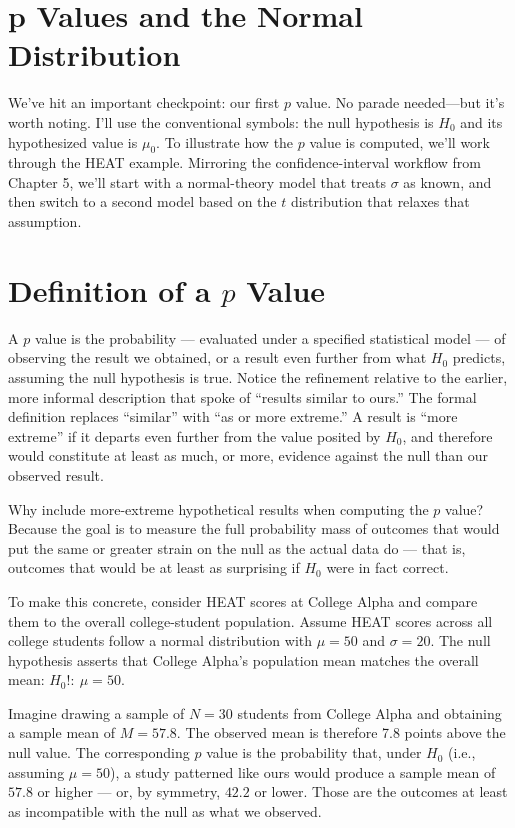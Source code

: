 \documentclass[
  letterpaper,
  DIV=11,
  numbers=noendperiod]{scrreprt}
\begin{document}
\section{p Values and the Normal
Distribution}\label{p-values-and-the-normal-distribution}

We've hit an important checkpoint: our first \(p\) value. No parade
needed---but it's worth noting. I'll use the conventional symbols: the
null hypothesis is \(H_0\) and its hypothesized value is \(\mu_0\). To
illustrate how the \(p\) value is computed, we'll work through the HEAT
example. Mirroring the confidence-interval workflow from Chapter 5,
we'll start with a normal-theory model that treats \(\sigma\) as known,
and then switch to a second model based on the \(t\) distribution that
relaxes that assumption.

\section{\texorpdfstring{Definition of a \(p\)
Value}{Definition of a p Value}}\label{definition-of-a-p-value}

A \(p\) value is the probability --- evaluated under a specified
statistical model --- of observing the result we obtained, or a result
even further from what \(H_0\) predicts, assuming the null hypothesis is
true. Notice the refinement relative to the earlier, more informal
description that spoke of ``results similar to ours.'' The formal
definition replaces ``similar'' with ``as or more extreme.'' A result is
``more extreme'' if it departs even further from the value posited by
\(H_0\), and therefore would constitute at least as much, or more,
evidence against the null than our observed result.

Why include more-extreme hypothetical results when computing the \(p\)
value? Because the goal is to measure the full probability mass of
outcomes that would put the same or greater strain on the null as the
actual data do --- that is, outcomes that would be at least as
surprising if \(H_0\) were in fact correct.

To make this concrete, consider HEAT scores at College Alpha and compare
them to the overall college-student population. Assume HEAT scores
across all college students follow a normal distribution with
\(\mu = 50\) and \(\sigma = 20\). The null hypothesis asserts that
College Alpha's population mean matches the overall mean:
\(H_0!:\ \mu = 50\).

Imagine drawing a sample of \(N = 30\) students from College Alpha and
obtaining a sample mean of \(M = 57.8\). The observed mean is therefore
7.8 points above the null value. The corresponding \(p\) value is the
probability that, under \(H_0\) (i.e., assuming \(\mu = 50\)), a study
patterned like ours would produce a sample mean of \(57.8\) or higher
--- or, by symmetry, \(42.2\) or lower. Those are the outcomes at least
as incompatible with the null as what we observed.
\end{document}
